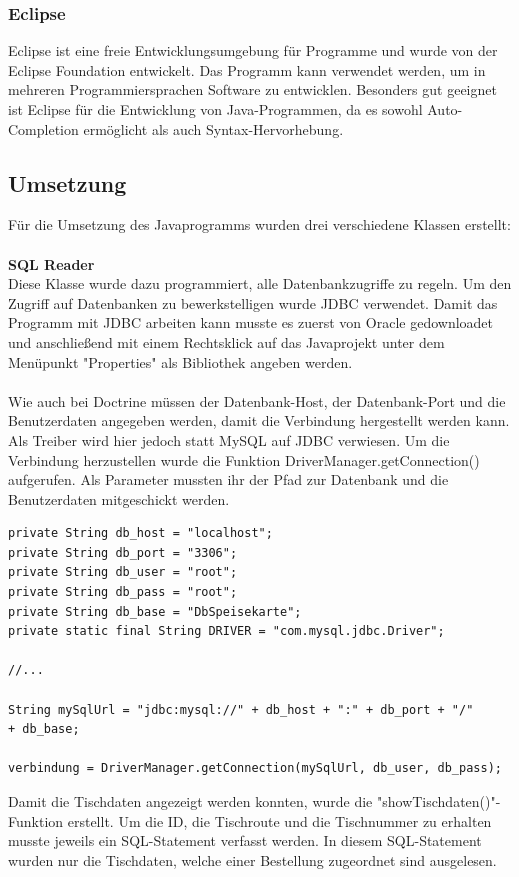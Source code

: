       \subsubsection{Eclipse}

Eclipse ist eine freie Entwicklungsumgebung für Programme und wurde von der Eclipse Foundation entwickelt. Das Programm kann verwendet werden, um in mehreren Programmiersprachen Software zu entwicklen. Besonders gut geeignet ist Eclipse für die Entwicklung von Java-Programmen, da es sowohl Auto-Completion ermöglicht als auch Syntax-Hervorhebung.

  \subsection{Umsetzung}
Für die Umsetzung des Javaprogramms wurden drei verschiedene Klassen erstellt:\\ \\
\textbf{SQL Reader}\\
Diese Klasse wurde dazu programmiert, alle Datenbankzugriffe zu regeln.
Um den {Zugriff auf Datenbanken zu bewerkstelligen wurde JDBC\cite{jdbctutorial}} verwendet.
Damit das Programm mit JDBC arbeiten kann musste es zuerst von Oracle gedownloadet und anschließend mit einem Rechtsklick auf das Javaprojekt unter dem Menüpunkt "Properties" als Bibliothek angeben werden.
\\ \\
Wie auch bei Doctrine müssen der Datenbank-Host, der Datenbank-Port und die Benutzerdaten angegeben werden, damit die Verbindung hergestellt werden kann.
Als Treiber wird hier jedoch statt MySQL auf JDBC verwiesen.
Um die Verbindung herzustellen wurde die Funktion DriverManager.getConnection() aufgerufen. Als Parameter mussten ihr der Pfad zur Datenbank und die Benutzerdaten mitgeschickt werden.
\lstset{language = java}
  	\begin{lstlisting}
private String db_host = "localhost";
private String db_port = "3306";
private String db_user = "root";
private String db_pass = "root";
private String db_base = "DbSpeisekarte";
private static final String DRIVER = "com.mysql.jdbc.Driver";

//...

String mySqlUrl = "jdbc:mysql://" + db_host + ":" + db_port + "/"
+ db_base;

verbindung = DriverManager.getConnection(mySqlUrl, db_user, db_pass);
	\end{lstlisting}
Damit die Tischdaten angezeigt werden konnten, wurde die "showTischdaten()"-Funktion erstellt. Um die ID, die Tischroute und die Tischnummer zu erhalten musste jeweils ein SQL-Statement verfasst werden. In diesem SQL-Statement wurden nur die Tischdaten, welche einer Bestellung zugeordnet sind ausgelesen.
